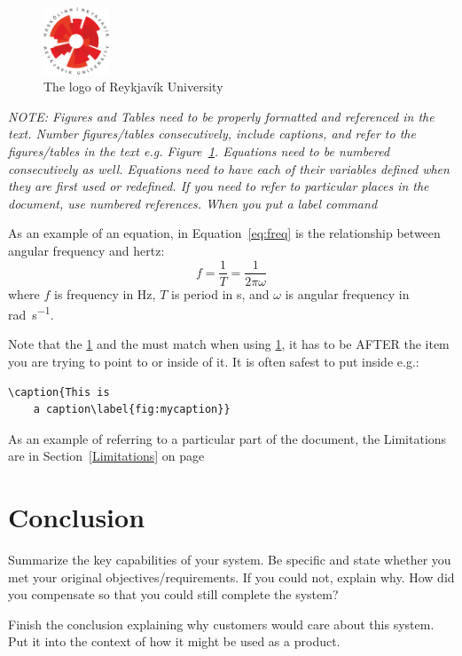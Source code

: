 \documentclass[12pt, svn, draft]{rureport}
\begin{document}
\begin{figure}
\centering
\includegraphics[height=20mm]{ru-logo}
\caption{The logo of Reykjavík University}\label{fig:ru-logo}
\end{figure}
\emph{NOTE: Figures and Tables need to be properly formatted and
  referenced in the text. Number figures/tables consecutively, include
  captions, and refer to the figures/tables in the text
  e.g. Figure~\ref{fig:ru-logo}. Equations need to be numbered
  consecutively as well.  Equations need to have each of their
  variables defined when they are first used or redefined.  If you
  need to refer to particular places in the document, use numbered
  references.  When you put a label{} command }

As an example of an equation, in Equation~\ref{eq:freq} is the relationship between angular frequency and hertz:
\begin{equation}
f = \frac{1}{T} = \frac{1}{2\pi\omega}\label{eq:freq}
\end{equation}
where $f$ is frequency in \si{\hertz}, $T$ is period in \si{\second}, and
$\omega$ is angular frequency in \si{\radian\per\second}.

Note that the \ref{} and the \label{} must match when using \ref{}, it
has to be AFTER the item you are trying to point to or inside of it.
It is often safest to put inside e.g.:\begin{verbatim}\caption{This is
    a caption\label{fig:mycaption}}\end{verbatim}

As an example of referring to a particular part of the document, the
Limitations are in Section~\ref{Limitations} on
page~\pageref{Limitations}

\section{Conclusion}
Summarize the key capabilities of your system. Be specific and state
whether you met your original objectives/requirements. If you could
not, explain why.  How did you compensate so that you could still
complete the system?

Finish the conclusion explaining why customers would care about this
system.  Put it into the context of how it might be used as a product.
\end{document}
